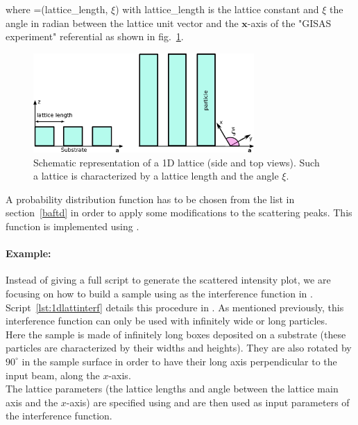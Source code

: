\newpage{\cleardoublepage}
\subsubsection{  } \label{paragraph1dlatt}
where  =(lattice\_length, $\xi$) with lattice\_length is the lattice constant and $\xi$ the angle in radian between the lattice unit vector and the $\mathbf{x}$-axis of the "GISAS experiment" referential as shown in fig.~\ref{fig:1dgrating}.

\begin{figure}[h]
\begin{center}
\includegraphics[width=0.75\textwidth]{Figures/1DGrating}
\end{center}
\caption{Schematic representation of a 1D lattice (side and top views). Such a lattice is characterized by a lattice length and the angle $\xi$.}
\label{fig:1dgrating}
\end{figure}


\vspace{12pt}
A probability distribution function  has to be chosen from the list in section~\ref{baftd} in order to apply some  modifications to the scattering peaks. This function is implemented using . 

\paragraph{Example:} Instead of giving a full script to generate the scattered intensity plot, we are focusing on how to build a sample using  as the interference function in \BornAgain .\\ Script~\ref{lst:1dlattinterf} details this procedure in . As mentioned previously, this interference function can only be used with infinitely wide or long particles.\\ Here the sample is made of infinitely long boxes deposited on a substrate (these particles are characterized by their widths and heights). They are also rotated by $90^{\circ}$  in the sample surface in order to have their long axis perpendicular to the input beam, along the $x$-axis.\\
 The lattice parameters (the lattice lengths and angle between the lattice main axis and the $x$-axis) are specified using  and are then used as input parameters of the interference function.

